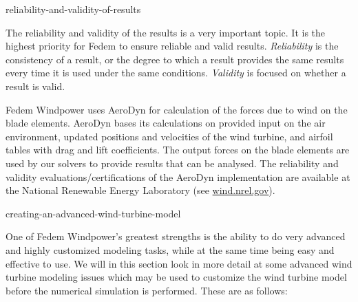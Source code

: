            {reliability-and-validity-of-results}

The reliability and validity of the results is a very important topic.
It is the highest priority for Fedem to ensure reliable and valid results.
{\sl Reliability} is the consistency of a result, or the degree to which
a result provides the same results every time it is used under the same
conditions. {\sl Validity} is focused on whether a result is valid.

Fedem Windpower uses AeroDyn for calculation of the forces due to wind on the
blade elements. AeroDyn bases its calculations on provided input on the air
environment, updated positions and velocities of the wind turbine, and airfoil
tables with drag and lift coefficients. The output forces on the blade elements
are used by our solvers to provide results that can be analysed.
The reliability and validity evaluations/certifications of the AeroDyn
implementation are available at the National Renewable Energy Laboratory
(see \href{https://wind.nrel.gov/}{wind.nrel.gov}).


        {creating-an-advanced-wind-turbine-model}

One of Fedem Windpower's greatest strengths is the ability to do very advanced
and highly customized modeling tasks, while at the same time being easy and
effective to use. We will in this section look in more detail at some advanced
wind turbine modeling issues which may be used to customize the wind turbine
model before the numerical simulation is performed. These are as follows:

